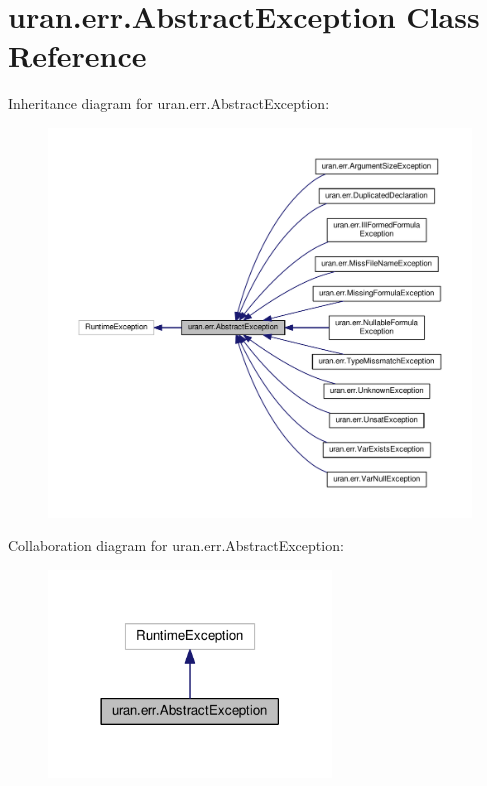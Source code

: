 \hypertarget{classuran_1_1err_1_1_abstract_exception}{}\section{uran.\+err.\+Abstract\+Exception Class Reference}
\label{classuran_1_1err_1_1_abstract_exception}


Inheritance diagram for uran.\+err.\+Abstract\+Exception\+:
\nopagebreak
\begin{figure}[H]
\begin{center}
\leavevmode
\includegraphics[width=350pt]{classuran_1_1err_1_1_abstract_exception__inherit__graph}
\end{center}
\end{figure}


Collaboration diagram for uran.\+err.\+Abstract\+Exception\+:
\nopagebreak
\begin{figure}[H]
\begin{center}
\leavevmode
\includegraphics[width=213pt]{classuran_1_1err_1_1_abstract_exception__coll__graph}
\end{center}
\end{figure}
